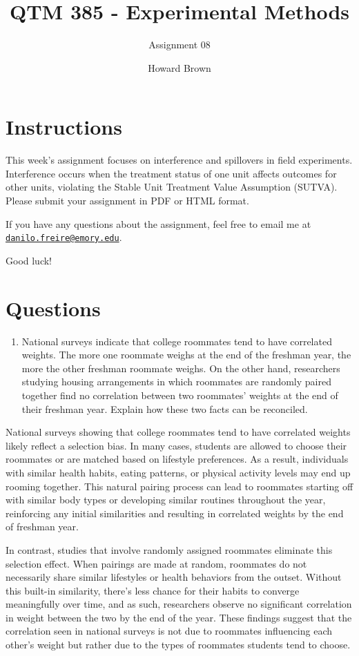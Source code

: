 \documentclass[
  letterpaper,
  DIV=11,
  numbers=noendperiod]{scrartcl}
\title{QTM 385 - Experimental Methods}
\subtitle{Assignment 08}
\author{Howard Brown}
\date{}
\providecommand{\tightlist}{%
  \setlength{\itemsep}{0pt}\setlength{\parskip}{0pt}}\usepackage{longtable,booktabs,array}
\begin{document}
\maketitle


\section{Instructions}\label{instructions}

This week's assignment focuses on interference and spillovers in field
experiments. Interference occurs when the treatment status of one unit
affects outcomes for other units, violating the Stable Unit Treatment
Value Assumption (SUTVA). Please submit your assignment in PDF or HTML
format.

If you have any questions about the assignment, feel free to email me at
\href{mailto:danilo.freire@emory.edu}{\nolinkurl{danilo.freire@emory.edu}}.

Good luck!

\section{Questions}\label{questions}

\begin{enumerate}
\def\labelenumi{\arabic{enumi}.}
\tightlist
\item
  National surveys indicate that college roommates tend to have
  correlated weights. The more one roommate weighs at the end of the
  freshman year, the more the other freshman roommate weighs. On the
  other hand, researchers studying housing arrangements in which
  roommates are randomly paired together find no correlation between two
  roommates' weights at the end of their freshman year. Explain how
  these two facts can be reconciled.
\end{enumerate}

National surveys showing that college roommates tend to have correlated
weights likely reflect a selection bias. In many cases, students are
allowed to choose their roommates or are matched based on lifestyle
preferences. As a result, individuals with similar health habits, eating
patterns, or physical activity levels may end up rooming together. This
natural pairing process can lead to roommates starting off with similar
body types or developing similar routines throughout the year,
reinforcing any initial similarities and resulting in correlated weights
by the end of freshman year.

In contrast, studies that involve randomly assigned roommates eliminate
this selection effect. When pairings are made at random, roommates do
not necessarily share similar lifestyles or health behaviors from the
outset. Without this built-in similarity, there's less chance for their
habits to converge meaningfully over time, and as such, researchers
observe no significant correlation in weight between the two by the end
of the year. These findings suggest that the correlation seen in
national surveys is not due to roommates influencing each other's weight
but rather due to the types of roommates students tend to choose.
\end{document}
